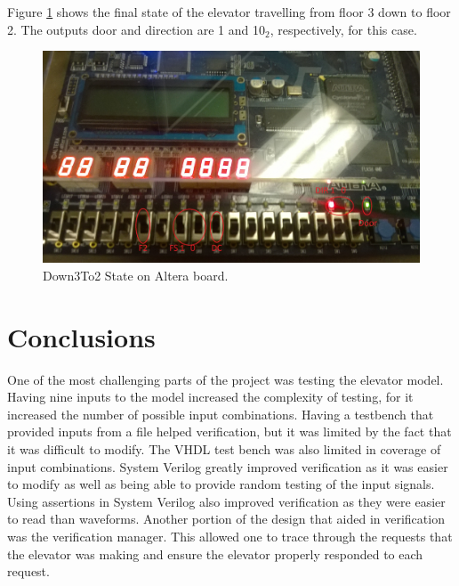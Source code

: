 \documentclass[journal]{IEEEtran}
\begin{document}
Figure \ref{down3to2} shows the final state of the elevator travelling from floor 3 down to floor 2. The outputs door and direction are 1 and 10$_{2}$, respectively, for this case.

\begin{figure}[h]
\centering
\includegraphics[width=0.9\linewidth]{Down3To2.jpg}
\caption{Down3To2 State on Altera board.}
\label{down3to2}
\end{figure}

\section{Conclusions}
One of the most challenging parts of the project was testing the elevator model. Having nine inputs to the model increased the complexity of testing, for it increased the number of possible input combinations. Having a testbench that provided inputs from a file helped verification, but it was limited by the fact that it was difficult to modify. The VHDL test bench was also limited in coverage of input combinations. System Verilog greatly improved verification as it was easier to modify as well as being able to provide random testing of the input signals. Using assertions in System Verilog also improved verification as they were easier to read than waveforms. Another portion of the design that aided in verification was the verification manager. This allowed one to trace through the requests that the elevator was making and ensure the elevator properly responded to each request.

\end{document}
